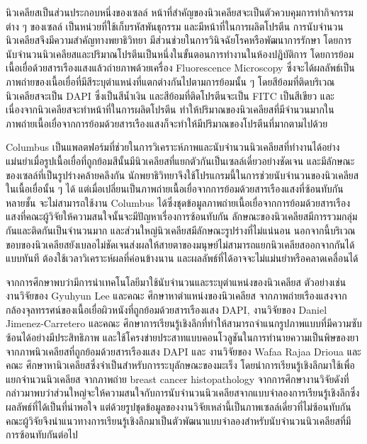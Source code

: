 \documentclass[12pt,oneside,openright,a4paper]{cpe-thai-project}
\begin{document}
นิวเคลียสเป็นส่วนประกอบหนึ่งของเซลล์ หน้าที่สำคัญของนิวเคลียสจะเป็นตัวควบคุมการทำกิจกรรมต่าง ๆ ของเซลล์ \cite{cell2} เป็นหน่วยที่ใช้เก็บรหัสพันธุกรรม และมีหน้าที่ในการผลิตโปรตีน\cite{cell3} การนับจำนวนนิวเคลียสจึงมีความสำคัญทางพยาธิวิทยา มีส่วนช่วยในการวินิจฉัยโรคหรือพัฒนาการรักษา โดยการนับจำนวนนิวเคลียสและปริมาณโปรตีนเป็นหนึ่งในขั้นตอนการทำงานในห้องปฎิบัติการ โดยการย้อมเนื้อเยื่อด้วยสารเรืองแสงแล้วถ่ายภาพด้วยเครื่อง Fluorescence Microscopy ซึ่งจะได้ผลลัพธ์เป็นภาพถ่ายของเนื้อเยื่อที่มีสีระบุตำแหน่งที่แตกต่างกันไปตามการย้อมนั้น ๆ โดยสีย้อมที่ติดบริเวณนิวเคลียสจะเป็น DAPI ซึ่งเป็นสีน้ำเงิน และสีย้อมที่ติดโปรตีนจะเป็น FITC เป็นสีเขียว และเนื่องจากนิวเคลียสจะทำหน้าที่ในการผลิตโปรตีน ทำให้ปริมาณของนิวเคลียสที่มีจำนวนมากในภาพถ่ายเนื้อเยื่อจากการย้อมด้วยสารเรืองแสงก็จะทำให้มีปริมาณของโปรตีนที่มากตามไปด้วย 

Columbus \cite{11} เป็นแพลตฟอร์มที่ช่วยในการวิเคราะห์ภาพและนับจำนวนนิวเคลียสที่ทำงานได้อย่างแม่นยำเมื่อรูปเนื้อเยื่อที่ถูกย้อมสีนั้นมีนิวเคลียสที่แยกตัวกันเป็นเซลล์เดี่ยวอย่างชัดเจน และมีลักษณะของเซลล์ที่เป็นรูปร่างคล้ายคลึงกัน นักพยาธิวิทยาจึงใช้โปรแกรมนี้ในการช่วยนับจำนวนของนิวเคลียสในเนื้อเยื่อนั้น ๆ ได้ แต่เมื่อเปลี่ยนเป็นภาพถ่ายเนื้อเยื่อจากการย้อมด้วยสารเรืองแสงที่ซ้อนทับกันหลายชั้น จะไม่สามารถใช้งาน Columbus ได้ซึ่งชุดข้อมูลภาพถ่ายเนื้อเยื่อจากการย้อมด้วยสารเรืองแสงที่คณะผู้วิจัยให้ความสนใจนั้นจะมีปัญหาเรื่องการซ้อนทับกัน ลักษณะของนิวเคลียสมีการรวมกลุ่มกันและติดกันเป็นจำนวนมาก และส่วนใหญ่นิวเคลียสมีลักษณะรูปร่างที่ไม่แน่นอน นอกจากนี้บริเวณขอบของนิวเคลียสยังเบลอไม่ชัดเจนส่งผลให้สายตาของมนุษย์ไม่สามารถแยกนิวเคลียสออกจากกันได้แบบทันที ต้องใช้เวลาวิเคราะห์ผลที่ค่อนข้างนาน และผลลัพธ์ที่ได้อาจจะไม่แม่นยำหรือคลาดเคลื่อนได้

จากการศึกษาพบว่ามีการนำเทคโนโลยีมาใช้นับจำนวนและระบุตำแหน่งของนิวเคลียส ตัวอย่างเช่น งานวิจัยของ Gyuhyun Lee และคณะ \cite{28} ศึกษาหาตำแหน่งของนิวเคลียส จากภาพถ่ายเรืองแสงจากกล้องจุลทรรศน์ของเนื้อเยื่อผิวหนังที่ถูกย้อมด้วยสารเรืองแสง DAPI, งานวิจัยของ Daniel Jimenez-Carretero และคณะ \cite{29} ศึกษาการเรียนรู้เชิงลึกที่ทําให้สามารถจําแนกรูปภาพแบบที่มีความซับซ้อนได้อย่างมีประสิทธิภาพ และใช้โครงข่ายประสาทแบบคอนโวลูชันในการทำนายความเป็นพิษของยาจากภาพนิวเคลียสที่ถูกย้อมด้วยสารเรืองแสง DAPI และ งานวิจัยของ Wafaa Rajaa Drioua และคณะ \cite{yolopaper} ศึกษาหานิวเคลียสซึ่งจําเป็นสําหรับการระบุลักษณะของมะเร็ง โดยนำการเรียนรู้เชิงลึกมาใช้เพื่อแยกจำนวนนิวเคลียส จากภาพถ่าย breast cancer histopathology จากการศึกษางานวิจัยดังที่กล่าวมาพบว่าส่วนใหญ่จะให้ความสนใจกับการนับจำนวนนิวเคลียสจากแบบจำลองการเรียนรู้เชิงลึกซึ่งผลลัพธ์ที่ได้เป็นที่น่าพอใจ แต่ด้วยรูปชุดข้อมูลของงานวิจัยเหล่านี้เป็นภาพเซลล์เดี่ยวที่ไม่ซ้อนทับกัน คณะผู้วิจัยจึงนำแนวทางการเรียนรู้เชิงลึกมาเป็นตัวพัฒนาแบบจำลองสำหรับนับจำนวนนิวเคลียสที่มีการซ้อนทับกันต่อไป
\end{document}
